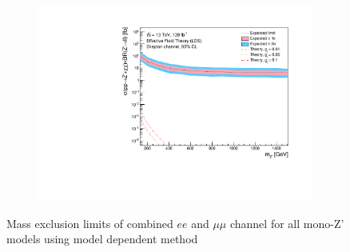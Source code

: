 \documentclass[12pt, a4paper]{book}
\begin{document}
\begin{figure}[!ht]
\begin{subfigure}[b]{0.49\textwidth}
   \end{subfigure}
   \hfill
   \begin{subfigure}[b]{0.49\textwidth}
      \centering
      \includegraphics[width=1\textwidth]{Limits/EFT_LDS/mass_exclusion_comb.pdf}
   \end{subfigure}
   \caption[Mass exclusion limits of combined $ee$ and $\mu\mu$ channel for all mono-Z' models using model dependent method]{Mass exclusion limits of combined $ee$ and $\mu\mu$ channel for all mono-Z' models using model dependent method}
\end{figure}
\clearpage


\clearpage
\end{document}
